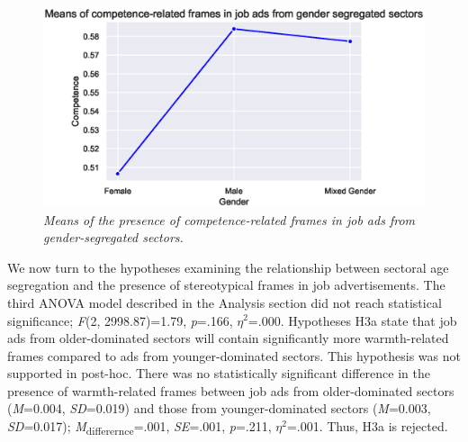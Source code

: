 \documentclass[Royal,sageapa,times]{sagej}
\begin{document}
\begin{figure}[ht]
    \setlength{\fboxsep}{0pt}%
    \setlength{\fboxrule}{0pt}%
    \begin{center}
    \includegraphics[width=\textwidth]{FT/Figure2.eps}
    \end{center}
    \caption{\textit{Means of the presence of competence-related frames in job ads from gender-segregated sectors.}}
    \label{figure2}
    \end{figure}

We now turn to the hypotheses examining the relationship between sectoral age segregation and the presence of stereotypical frames in job advertisements. The third ANOVA model described in the Analysis section did not reach statistical significance; \textit{F}(2, 2998.87)=1.79, \textit{p}=.166, \textit{$\eta^2$}=.000. Hypotheses H3a state that job ads from older-dominated sectors will contain significantly more warmth-related frames compared to ads from younger-dominated sectors. This hypothesis was not supported in post-hoc. There was no statistically significant difference in the presence of warmth-related frames between job ads from older-dominated sectors (\textit{M}=0.004, \textit{SD}=0.019) and those from younger-dominated sectors (\textit{M}=0.003, \textit{SD}=0.017); \textit{M}\textsubscript{differernce}=.001, \textit{SE}=.001, \textit{p}=.211, \textit{$\eta^2$}=.001. Thus, H3a is rejected.
\end{document}
